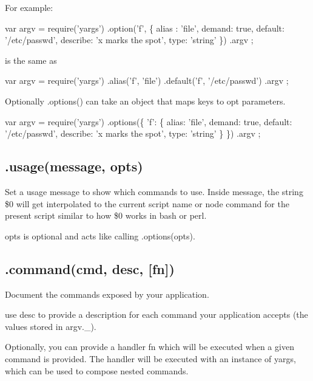 For example\+:


\begin{DoxyCode}
var argv = require('yargs')
    .option('f', \{
        alias : 'file',
        demand: true,
        default: '/etc/passwd',
        describe: 'x marks the spot',
        type: 'string'
    \})
    .argv
;
\end{DoxyCode}


is the same as


\begin{DoxyCode}
var argv = require('yargs')
    .alias('f', 'file')
    .default('f', '/etc/passwd')
    .argv
;
\end{DoxyCode}


Optionally {\ttfamily .options()} can take an object that maps keys to {\ttfamily opt} parameters.


\begin{DoxyCode}
var argv = require('yargs')
    .options(\{
      'f': \{
        alias: 'file',
        demand: true,
        default: '/etc/passwd',
        describe: 'x marks the spot',
        type: 'string'
      \}
    \})
    .argv
;
\end{DoxyCode}


\subsection*{.usage(message, opts) }

Set a usage message to show which commands to use. Inside {\ttfamily message}, the string {\ttfamily \$0} will get interpolated to the current script name or node command for the present script similar to how {\ttfamily \$0} works in bash or perl.

{\ttfamily opts} is optional and acts like calling {\ttfamily .options(opts)}.

\subsection*{.command(cmd, desc, \mbox{[}fn\mbox{]}) }

Document the commands exposed by your application.

use {\ttfamily desc} to provide a description for each command your application accepts (the values stored in {\ttfamily argv.\+\_\+}).

Optionally, you can provide a handler {\ttfamily fn} which will be executed when a given command is provided. The handler will be executed with an instance of {\ttfamily yargs}, which can be used to compose nested commands.

